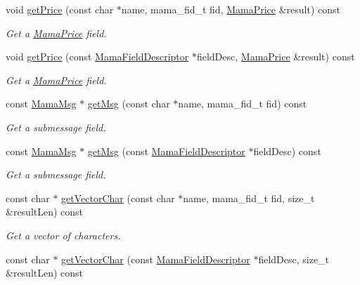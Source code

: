 \begin{DoxyCompactItemize}
void \hyperlink{classWombat_1_1MamaMsg_a75e26b3eead779cbf176a2866a873735}{getPrice} (const char $\ast$name, mama\_\-fid\_\-t fid, \hyperlink{classWombat_1_1MamaPrice}{MamaPrice} \&result) const 
\begin{DoxyCompactList}\small\item\em Get a \hyperlink{classWombat_1_1MamaPrice}{MamaPrice} field. \item\end{DoxyCompactList}\item 
void \hyperlink{classWombat_1_1MamaMsg_ae6883111d8b7dae35e217f1ff3bca05f}{getPrice} (const \hyperlink{classWombat_1_1MamaFieldDescriptor}{MamaFieldDescriptor} $\ast$fieldDesc, \hyperlink{classWombat_1_1MamaPrice}{MamaPrice} \&result) const 
\begin{DoxyCompactList}\small\item\em Get a \hyperlink{classWombat_1_1MamaPrice}{MamaPrice} field. \item\end{DoxyCompactList}\item 
const \hyperlink{classWombat_1_1MamaMsg}{MamaMsg} $\ast$ \hyperlink{classWombat_1_1MamaMsg_acac1f64580def4825e5e54965c17c99e}{getMsg} (const char $\ast$name, mama\_\-fid\_\-t fid) const 
\begin{DoxyCompactList}\small\item\em Get a submessage field. \item\end{DoxyCompactList}\item 
const \hyperlink{classWombat_1_1MamaMsg}{MamaMsg} $\ast$ \hyperlink{classWombat_1_1MamaMsg_a3f28110dc738d89709c283a746d1a710}{getMsg} (const \hyperlink{classWombat_1_1MamaFieldDescriptor}{MamaFieldDescriptor} $\ast$fieldDesc) const 
\begin{DoxyCompactList}\small\item\em Get a submessage field. \item\end{DoxyCompactList}\item 
const char $\ast$ \hyperlink{classWombat_1_1MamaMsg_a6a5722d1d645f546d6b035f7bf0ab30a}{getVectorChar} (const char $\ast$name, mama\_\-fid\_\-t fid, size\_\-t \&resultLen) const 
\begin{DoxyCompactList}\small\item\em Get a vector of characters. \item\end{DoxyCompactList}\item 
const char $\ast$ \hyperlink{classWombat_1_1MamaMsg_a2529f77c57588e32a954fbc48cde67ff}{getVectorChar} (const \hyperlink{classWombat_1_1MamaFieldDescriptor}{MamaFieldDescriptor} $\ast$fieldDesc, size\_\-t \&resultLen) const 

\end{DoxyCompactItemize}
